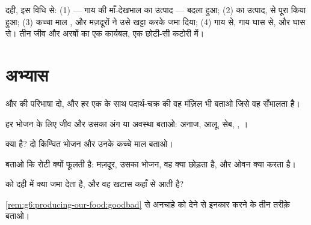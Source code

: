 \begin{example}[नाश्ते पर यह विधि]\label{ex:g6:producing-our-food:breakfast}
दही, इस विधि से: (1)  --- गाय की माँ-देखभाल का उत्पाद --- बदला
हुआ; (2)  का उत्पाद,  से पूरा किया हुआ; (3) कच्चा
माल , और मज़दूरों ने उसे खट्टा करके जमा दिया; (4)  गाय से, गाय
घास से, और घास  से। तीन जीव और अरबों का एक कार्यबल, एक छोटी-सी
कटोरी में।
\end{example}

\section{अभ्यास}

\begin{exercise}[$\star$]\label{exo:g6:producing-our-food:1}
 और  की परिभाषा दो, और हर एक के साथ पदार्थ-चक्र की वह
मंज़िल भी बताओ जिसे वह सँभालता है।
\end{exercise}

\begin{exercise}[$\star$]\label{exo:g6:producing-our-food:2}
हर भोजन के लिए जीव और उसका अंग या अवस्था बताओ: अनाज, आलू, सेब, ,
।
\end{exercise}

\begin{exercise}[$\star$]\label{exo:g6:producing-our-food:3}
 क्या है? दो किण्वित भोजन और उनके कच्चे माल बताओ।
\end{exercise}

\begin{exercise}[$\star$]\label{exo:g6:producing-our-food:4}
बताओ कि रोटी क्यों फूलती है: मज़दूर, उसका भोजन, वह क्या छोड़ता है, और
ओवन क्या करता है।
\end{exercise}

\begin{exercise}[$\star$]\label{exo:g6:producing-our-food:5}
 को दही में क्या जमा देता है, और वह खटास कहाँ से आती है?
\end{exercise}

\begin{exercise}[$\star$]\label{exo:g6:producing-our-food:6}
\cref{rem:g6:producing-our-food:goodbad} से अनचाहे  को
 देने से इनकार करने के तीन तरीक़े बताओ।
\end{exercise}

